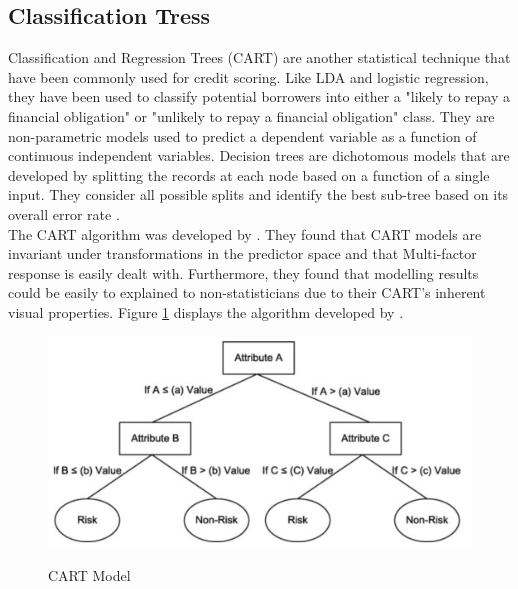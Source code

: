 \subsection{Classification Tress}

Classification and Regression Trees (CART) are another statistical technique that have been commonly used for credit scoring. Like LDA and logistic regression, they have been used to classify potential borrowers into either a "likely to repay a financial obligation" or "unlikely to repay a financial obligation" class. They are non-parametric models used to predict a dependent variable as a function of continuous independent variables. Decision trees are dichotomous models that are developed by splitting the records at each node based on a function of a single input. They consider all possible splits and identify the best sub-tree based on its overall error rate \parencite{DecTreesZekic}. \\

The CART algorithm was developed by \textcite{DecTreesBrieman}. They found that CART models are invariant under transformations in the predictor space and that Multi-factor response is easily dealt with. Furthermore, they found that modelling results could be easily to explained to non-statisticians due to their CART's inherent visual properties. Figure \ref{fig:CART} displays the algorithm developed by \textcite{DecTreesBrieman}. 

\vspace{15pt}

\begin{figure}[!htb]
\centering
\includegraphics[width = \textwidth]{images/CART.png}
\caption{CART Model}
\parencite{DecTreesBrieman}
\label{fig:CART}
\end{figure}

\vspace{15pt}

